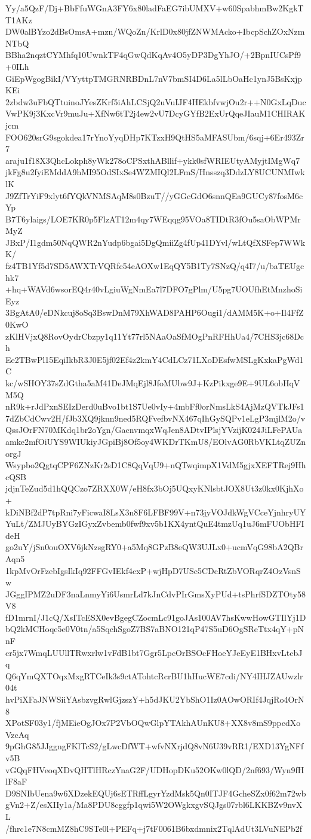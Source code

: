 Yy/a5QzF/Dj+BbFfuWGnA3FY6x80ladFaEG7ibUMXV+w60SpabhmBw2KgkTT1AKz
DW0alBYzo2dBsOmsA+mzn/WQoZn/KrlD0x80jfZNWMAcko+IbcpSchZOxNzmNTbQ
BBha2nqztCYMhfq10UwnkTF4qGwQdKqAv4O5yDP3DgYhJO/+2BpnIUCsPf9+0ILh
GiEpWgogBikI/VYyttpTMGRNRBDnL7nV7bmSI4D6La5lLbOaHc1ynJ5BsKxjpKEi
2zbdw3uFbQTtuinoJYesZKrf5iAhLCSjQ2uVuIJF4HEkbfvwjOu2r++N0GxLqDuc
VwPK9j3KxcVr9muJu+XfNw6tT2j4ew2vU7DcyGYfB2ExUrQqeJIauM1CHIRAKjcm
FOO620srG9sgokdea17rYnoYyqDHp7KTzxH9QtHS5aMFASUbm/6sqj+6Er493Zr7
araju1f18X3QhcLokph8yWk278oCPSxthABllif+ykk0sfWRIEUtyAMyjtIMgWq7
jkFg8u2fyiEMddA9hMI95OdSIxSe4WZMIQl2LFmS/Hnsszq3DdzLY8UCUNMIwklK
J9ZfTrYiF9xlyt6fYQkVNMSAqM8s0BzuT//yGGcGdO6snnQEa9GUCy87fosM6cYp
B7T6ylaigs/LOE7KR0p5FlzAT12m4qy7WEqqg95VOa8TIDtR3fOu5saObWPMrMyZ
JBxP/I1gdm50NqQWR2nYudp6bgai5DgQmiiZg4fUp41DYvl/wLtQfXSFep7WWkK/
fz4TB1Yf5d7SD5AWXTrVQRfc54eAOXw1EqQY5B1Ty7SNzQ/q4I7/u/baTEUgchk7
+hq+WAVd6wsorEQ4r40vLgiuWgNmEa7l7DFO7gPlm/U5pg7UOUfhEtMnzhoSiEyz
3BgAtA0/eDNkcuj8oSq3BswDnM79XhWAD8PAHP6Ougi1/dAMM5K+o+Il4FfZ0KwO
zKlHVjxQ8RovOydrCbzpy1q11Yt77rl5NAaOaSfMOgPnRFHhUa4/7CHS3jc68Dch
Ee2TBwPl15EqiIkbR3J0E5jf02Ef4z2kmY4CdLCz71LXoDEsfwMSLgKxkaPgWd1C
kc/wSHOY37sZdGtha5aM41DeJMqEjl8JfoMUbw9J+KzPikxge9E+9UL6obHqVM5Q
nR9k+rJdPxnSEIzDerd0uBvo1bt1S7Ue0vIy+4mbFf0orNmsLkS4AjMzQVTkJFs1
7dZbCdCwv2H/fJb3XQ9jknn9ned5RQFvefbvNX467qIhGySQPv1eLgP3mjlM2o/v
QssJOrFN70MKdq1br2oYgn/GacnvmqxWqJen8ADtvIPlsjYVzijK024JiLFePAUa
amke2mfOiUYS9WIUkiyJGpiBj8Of5oy4WKDrTKmU8/EOlvAG0RbVKLtqZUZnorgJ
Wsypbo2QgtqCPF6ZNzKr2sD1C8QqVqU9+nQTwqimpX1VdM5gjxXEFTRej9HhcQSB
jdjnTeZud5d1hQQCzo7ZRXX0W/eH8fx3bOj5UQxyKNlsbtJOX8Ut3z0kx0KjhXo+
kDiNBf2dP7tpRni7yFicwaI8LsX3n8F6LFBF99V+n73jyVOJdkWgVCceYjnhryUY
YuLt/ZMJUyBYGzIGyxZvbemb0fwf9xv5b1KX4yntQuE4tmzUq1uJ6mFUObHFIdeH
go2uY/jSn0ouOXV6jkNzsgRY0+a5Mq8GPzB8eQW3UJLx0+ucmVqG98bA2QBrAqn5
1kpMvOrFzebIgsIkIq92FFGvIEkf4cxP+wjHpD7USc5CDcRtZbVORqrZ4OzVsnSw
JGggIPMZ2uDF3naLnmyYi6UsmrLd7kJnCdvPIrGmsXyPUd+tsPhrfSDZTOty58V8
fD1mrnI/J1cQ/XsITcESX0evBgegCZocmLc91goJAs100AV7hsKwwHowGTIlYj1D
bQ2kMCHoqe5e0V0tn/a5SqchSgoZ7BS7aBNO121qP47S5uD6OgSReTtx4qY+pNnF
cr5jx7WmqLUUllTRwxrlw1vFdB1bt7Ggr5LpcOrBSOcFHoeYJeEyE1BHxvLtcbJq
Q6qYmQXTOqxMxgRTCeIk3s9ctATohtcRcrBU1hHucWE7cdi/NY4IHJZAUwzlr04t
hvPiXFaJNWSiiYAsbzvgRwlGjzszY+h5dJKU2YbShO1Iz0AOwORIf4JqjRo4OrN8
XPotSF03y1/fjMEieOgJOx7P2VbOQwGlpYTAkhAUnKU8+XX8v8mS9ppcdXoVzcAq
9pGhG85JJggngFKlTcS2/gLwcDfWT+wfvNXrjdQ8vN6U39vRR1/EXD13YgNFfv5B
vGQqFHVeoqXDvQHTlHRczYnaG2F/UDHopDKu52OKw0lQD/2nf693/Wyn9fHlF8aF
D9SNIbUena9w6XDzekEQUj6sETRffLgyrYzdMsk5Qn0ITJF4GcheSZx0f62m72wb
gVn2+Z/esXIIy1a/Ma8PDU8cggfp1qwi5W2OWgkxgvSQJgs07rbl6LKKBZv9nvXL
/fhrc1e7N8cmMZ8hC9STe0l+PEFq+j7tF0061B6bxdmnix2TqlAdUt3LVuNEPb2f
